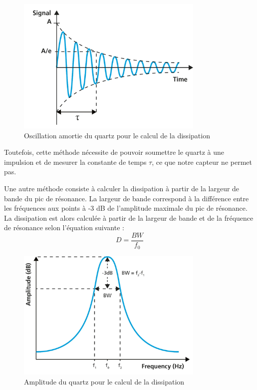 \begin{figure}[H]
    \centering
    \includegraphics[width=0.8\textwidth]{assets/figures/Dissipation TAU.png}
    \caption{Oscillation amortie du quartz pour le calcul de la dissipation \cite{Edvardsson2024Dissipation}}
    \label{fig:DissipationTAU}
\end{figure}

Toutefois, cette méthode nécessite de pouvoir soumettre le quartz à une impulsion et de mesurer la constante de temps $\tau$, ce que notre capteur ne permet pas.

Une autre méthode consiste à calculer la dissipation à partir de la largeur de bande du pic de résonance.  
La largeur de bande correspond à la différence entre les fréquences aux points à -3 dB de l'amplitude maximale du pic de résonance.  
La dissipation est alors calculée à partir de la largeur de bande et de la fréquence de résonance selon l'équation suivante :
\begin{equation}
    D = \frac{BW}{f_0}
    \label{eq:DissipationWidth}
\end{equation}

\begin{figure}[H]
    \centering
    \includegraphics[width=0.8\textwidth]{assets/figures/Dissipation Capteur AMP FREQU.png}
    \caption{Amplitude du quartz pour le calcul de la dissipation \cite{Edvardsson2024Dissipation}}
    \label{fig:DissipationWidth}
\end{figure}
\newpage

